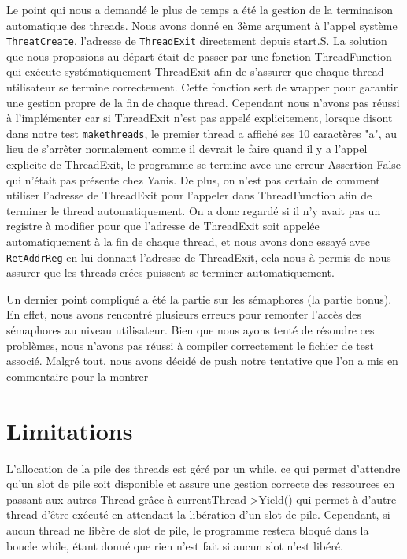 \documentclass[a4paper,11pt]{article}
\begin{document}
Le point qui nous a demandé le plus de temps a été la gestion de la terminaison automatique des threads. Nous avons donné en 3ème argument à l'appel système \texttt{ThreatCreate}, l'adresse de \texttt{ThreadExit} directement depuis start.S. La solution que nous
proposions au départ était de passer par une fonction ThreadFunction qui exécute systématiquement ThreadExit afin de
s'assurer que chaque thread utilisateur se termine correctement. Cette fonction sert de wrapper pour 
garantir une gestion propre de la fin de chaque thread. Cependant nous n'avons pas réussi à l'implémenter car si ThreadExit n'est pas appelé explicitement,
lorsque disont dans notre test \texttt{makethreads}, le premier thread a affiché ses 10 caractères "a", au lieu de s'arrêter normalement comme il devrait le faire quand il y a l'appel explicite de ThreadExit, le programme se termine avec une erreur Assertion False qui n'était pas présente chez Yanis. De plus, on n'est pas certain de comment utiliser l'adresse de ThreadExit pour l'appeler dans ThreadFunction afin de terminer le thread automatiquement. 
On a donc regardé si il n'y avait pas un registre à modifier pour que l'adresse de ThreadExit soit appelée automatiquement à la fin de chaque thread, et nous avons donc essayé avec \texttt{RetAddrReg} en lui donnant l'adresse de ThreadExit, cela nous à permis de nous assurer que les threads crées puissent se terminer automatiquement.

Un dernier point compliqué a été la partie sur les sémaphores (la partie bonus). En effet, nous avons rencontré plusieurs erreurs pour remonter l'accès des sémaphores au 
niveau utilisateur. Bien que nous ayons tenté de résoudre ces problèmes, nous n'avons pas réussi à compiler 
correctement le fichier de test associé. Malgré tout, nous avons décidé de push notre tentative que l'on a mis en commentaire pour la montrer



\section{Limitations}
L'allocation de la pile des threads est géré par un while, ce qui permet d'attendre qu'un slot de pile soit disponible et assure une gestion correcte des ressources en passant aux autres Thread grâce à currentThread->Yield() qui permet à d'autre thread d'être exécuté en attendant la libération d'un slot de pile.
 Cependant, si aucun thread ne libère de slot de pile, le programme restera bloqué dans la boucle while, étant donné que rien n'est fait si aucun slot n'est libéré.
\end{document}
